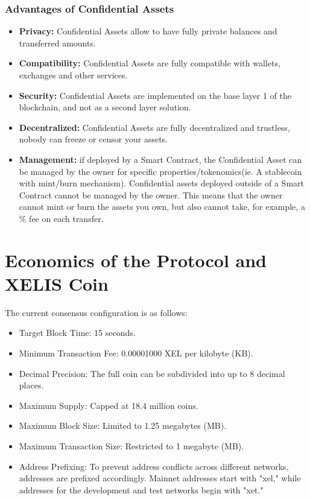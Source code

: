 \documentclass[10pt,a4paper,twocolumn]{article}
\begin{document}
\subsubsection{Advantages of Confidential Assets}
\begin{itemize}
\item \textbf{Privacy:} Confidential Assets allow to have fully private balances and transferred amounts.\\

\item \textbf{Compatibility:} Confidential Assets are fully compatible with wallets, exchanges and other services.\\

\item \textbf{Security:} Confidential Assets are implemented on the base layer 1 of the blockchain, and not as a second layer solution.\\

\item \textbf{Decentralized:} Confidential Assets are fully decentralized and trustless, nobody can freeze or censor your assets.\\

\item \textbf{Management:} if deployed by a Smart Contract, the Confidential Asset can be managed by the owner for specific properties/tokenomics(ie. A stablecoin with mint/burn mechanism). Confidential assets deployed outside of a Smart Contract cannot be managed by the owner. This means that the owner cannot mint or burn the assets you own, but also cannot take, for example, a \% fee on each transfer.\\
\end{itemize}

\section{Economics of the Protocol and XELIS Coin}

The current consensus configuration is as follows:

\begin{itemize}
    \item Target Block Time: 15 seconds.
    \item Minimum Transaction Fee: 0.00001000 XEL per kilobyte (KB).
    \item Decimal Precision: The full coin can be subdivided into up to 8 decimal places.
    \item Maximum Supply: Capped at 18.4 million coins.
    \item Maximum Block Size: Limited to 1.25 megabytes (MB).
    \item Maximum Transaction Size: Restricted to 1 megabyte (MB).
    \item Address Prefixing: To prevent address conflicts across different networks, addresses are prefixed accordingly. Mainnet addresses start with "xel," while addresses for the development and test networks begin with "xet."
\end{itemize}
\end{document}
